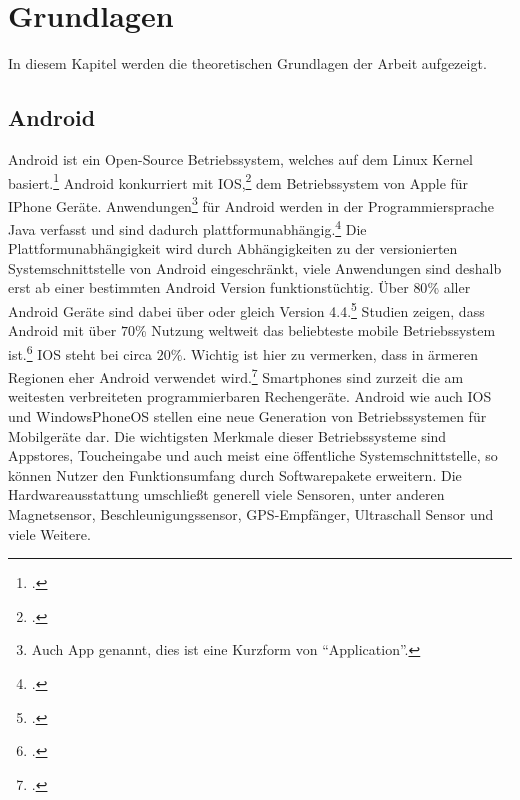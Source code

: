 \section{Grundlagen}
	In diesem Kapitel werden die theoretischen Grundlagen der Arbeit aufgezeigt.
\subsection{Android}\label{ssec:android}
	Android ist ein Open-Source Betriebssystem, welches auf dem Linux Kernel basiert.\footcite{android} Android konkurriert mit IOS,\footcite{ios} dem Betriebssystem von Apple für IPhone Geräte. Anwendungen\footnote{Auch App genannt, dies ist eine Kurzform von \enquote{Application}.} für Android werden in der Programmiersprache Java verfasst und sind dadurch plattformunabhängig.\footcite{java} Die Plattformunabhängigkeit wird durch Abhängigkeiten zu der versionierten Systemschnittstelle von Android eingeschränkt, viele Anwendungen sind deshalb erst ab einer bestimmten Android Version funktionstüchtig. Über $80$\% aller Android Geräte sind dabei über oder gleich Version 4.4.\footcite{android-fragmentation}
	Studien zeigen, dass Android mit über $70$\% Nutzung weltweit das beliebteste mobile Betriebssystem ist.\footcite[\url{http://gs.statcounter.com/\#mobile_os-ww-monthly-200812-201701}]{android-stats} IOS steht bei circa $20$\%. Wichtig ist hier zu vermerken, dass in ärmeren Regionen eher Android verwendet wird.\footcite[\url{http://gs.statcounter.com/\#mobile_os-ww-monthly-201701-201701-map}]{android-stats} Smartphones sind zurzeit die am weitesten verbreiteten programmierbaren Rechengeräte.
	Android wie auch IOS und WindowsPhoneOS stellen eine neue Generation von Betriebssystemen für Mobilgeräte dar. Die wichtigsten Merkmale dieser Betriebssysteme sind Appstores, Toucheingabe und auch meist eine öffentliche Systemschnittstelle, so können Nutzer den Funktionsumfang durch Softwarepakete erweitern.
	Die Hardwareausstattung umschließt generell viele Sensoren, unter anderen Magnetsensor, Beschleunigungssensor, GPS-Empfänger, Ultraschall Sensor und viele Weitere.

